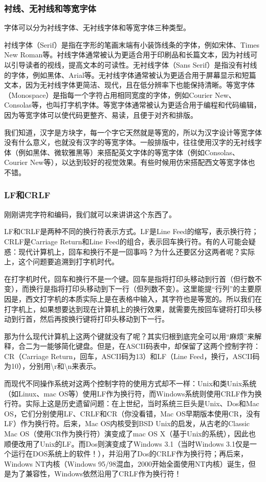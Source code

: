 \subsubsection{衬线、无衬线和等宽字体}

字体可以分为衬线字体、无衬线字体和等宽字体三种类型。

衬线字体（Serif）是指在字形的笔画末端有小装饰线条的字体，例如宋体、Times New Roman等。衬线字体通常被认为更适合用于印刷品和长篇文本，因为衬线可以引导读者的视线，提高文本的可读性。无衬线字体（Sans Serif）是指没有衬线的字体，例如黑体、Arial等。无衬线字体通常被认为更适合用于屏幕显示和短篇文本，因为无衬线字体更简洁、现代，且在低分辨率下也能保持清晰。等宽字体（Monospace）是指每一个字符占用相同宽度的字体，例如Courier New、Consolas等，也叫打字机字体。等宽字体通常被认为更适合用于编程和代码编辑，因为等宽字体可以使代码更整齐、易读，且便于对齐和排版。

我们知道，汉字是方块字，每一个字它天然就是等宽的，所以为汉字设计等宽字体没有什么意义，也就没有汉字的等宽字体。一般排版中，往往使用汉字的无衬线字体（例如黑体、微软雅黑等）来搭配英文字体的等宽字体（例如Consolas、Courier New等），以达到较好的视觉效果。有些时候用仿宋搭配西文等宽字体也不错。

\subsubsection{LF和CRLF}

刚刚讲完字符和编码，我们就可以来讲讲这个东西了。

LF和CRLF是两种不同的换行符表示方式。LF是Line Feed的缩写，表示换行符；CRLF是Carriage Return和Line Feed的组合，表示回车换行符。有的人可能会疑惑：现代计算机上，回车和换行不是一回事吗？为什么还要区分这两者呢？实际上，这个问题要追溯到打字机时代。

在打字机时代，回车和换行不是一个键。回车是指将打印头移动到行首（但行数不变），而换行是指将打印头移动到下一行（但列数不变）。这里能提“行列”的主要原因是，西文打字机的本质实际上是在表格中输入，其字符也是等宽的。所以我们在打字机上，如果想要达到现在计算机上的换行效果，就需要先按回车键将打印头移动到行首，然后再按换行键将打印头移动到下一行。

那为什么现代计算机上这两个键就没有了呢？其实归根到底完全可以用“麻烦”来解释，合二为一能够简化键盘。但是，在ASCII码表中，却保留了这两个控制字符：CR（Carriage Return，回车，ASCII码为13）和LF（Line Feed，换行，ASCII码为10），分别用\textbackslash r和\textbackslash n来表示。

而现代不同操作系统对这两个控制字符的使用方式却不一样：Unix和类Unix系统（如Linux、mac OS等）使用LF作为换行符，而Windows系统则使用CRLF作为换行符。实际上这是历史遗留问题：在上世纪，当时系统三巨头是Unix、Dos和Mac OS，它们分别使用LF、CRLF和CR（你没看错，Mac OS早期版本使用CR，没有LF）作为换行符。后来，Mac OS内核受到BSD Unix的启发，从古老的Classic Mac OS（使用CR作为换行符）演变成了mac OS X（基于Unix的系统），因此也顺便改用了Unix的LF。而Dos则演变成了Windows 3.1（当时Windows 3.1仅是一个运行在DOS系统上的软件！），并沿用了Dos的CRLF作为换行符；再后来，Windows NT内核（Windows 95/98混血，2000开始全面使用NT内核）诞生，但是为了兼容性，Windows依然沿用了CRLF作为换行符！


